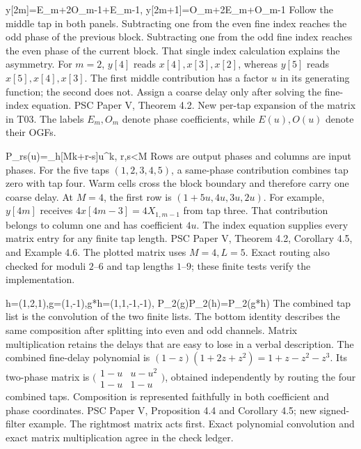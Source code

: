 {y[2m]=E_m+2O_{m-1}+E_{m-1},\qquad
 y[2m+1]=O_m+2E_m+O_{m-1}}
{Follow the middle tap in both panels. Subtracting one from the even fine index reaches the odd phase of the previous block. Subtracting one from the odd fine index reaches the even phase of the current block. That single index calculation explains the asymmetry.}
{For $m=2$, $y[4]$ reads $x[4],x[3],x[2]$, whereas $y[5]$ reads $x[5],x[4],x[3]$. The first middle contribution has a factor $u$ in its generating function; the second does not.}
{Assign a coarse delay only after solving the fine-index equation.}
{PSC Paper V, Theorem 4.2. New per-tap expansion of the matrix in T03. The labels $E_m,O_m$ denote phase coefficients, while $E(u),O(u)$ denote their OGFs.}

{P_{rs}(u)=\sum_{}h[Mk+r-s]u^k,
 \le r,s<M}
{Rows are output phases and columns are input phases. For the five taps $(1,2,3,4,5)$, a same-phase contribution combines tap zero with tap four. Warm cells cross the block boundary and therefore carry one coarse delay.}
{At $M=4$, the first row is $(1+5u,4u,3u,2u)$. For example, $y[4m]$ receives $4x[4m-3]=4X_{1,m-1}$ from tap three. That contribution belongs to column one and has coefficient $4u$.}
{The index equation supplies every matrix entry for any finite tap length.}
{PSC Paper V, Theorem 4.2, Corollary 4.5, and Example 4.6. The plotted matrix uses $M=4,L=5$. Exact routing also checked for moduli $2$--$6$ and tap lengths $1$--$9$; these finite tests verify the implementation.}

{h=(1,2,1),\quad g=(1,-1),\quad g*h=(1,1,-1,-1),
 \qquad P_2(g)P_2(h)=P_2(g*h)}
{The combined tap list is the convolution of the two finite lists. The bottom identity describes the same composition after splitting into even and odd channels. Matrix multiplication retains the delays that are easy to lose in a verbal description.}
{The combined fine-delay polynomial is $(1-z)(1+2z+z^2)=1+z-z^2-z^3$. Its two-phase matrix is $\bigl(\begin{smallmatrix}1-u&u-u^2\\1-u&1-u\end{smallmatrix}\bigr)$, obtained independently by routing the four combined taps.}
{Composition is represented faithfully in both coefficient and phase coordinates.}
{PSC Paper V, Proposition 4.4 and Corollary 4.5; new signed-filter example. The rightmost matrix acts first. Exact polynomial convolution and exact matrix multiplication agree in the check ledger.}


